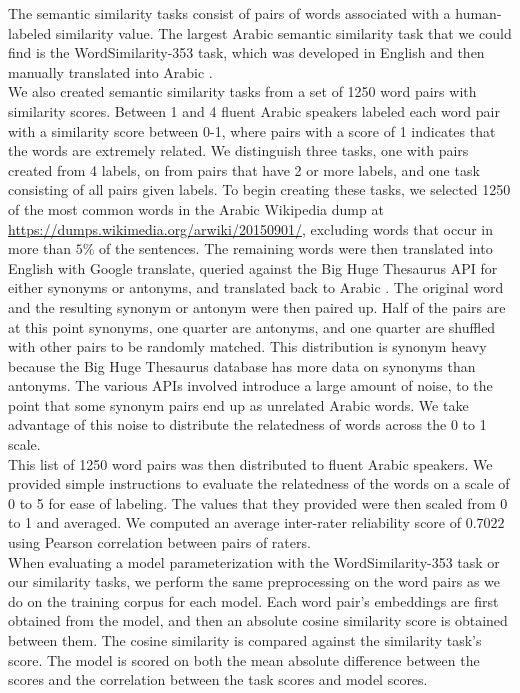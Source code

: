 The semantic similarity tasks consist of pairs of words associated with a human-labeled similarity value. The largest Arabic semantic similarity task that we could find is the WordSimilarity-353 task, which was developed in English and then manually translated into Arabic \cite{finkelstein:2001,hassan:2009}. 
\\
We also created semantic similarity tasks from a set of 1250 word pairs with similarity scores. Between 1 and 4 fluent Arabic speakers labeled each word pair with a similarity score between 0-1, where pairs with a score of 1 indicates that the words are extremely related. We distinguish three tasks, one with pairs created from 4 labels, on from pairs that have 2 or more labels, and one task consisting of all pairs given labels. To begin creating these tasks, we selected 1250 of the most common words in the Arabic Wikipedia dump \cite{wiki:xxx} at \url{https://dumps.wikimedia.org/arwiki/20150901/}, excluding words that occur in more than $5\%$ of the sentences. The remaining words were then translated into English with Google translate, queried against the Big Huge Thesaurus API for either synonyms or antonyms, and translated back to Arabic \cite{google:online,bhl:online}. The original word and the resulting synonym or antonym were then paired up. Half of the pairs are at this point synonyms, one quarter are antonyms, and one quarter are shuffled with other pairs to be randomly matched. This distribution is synonym heavy because the Big Huge Thesaurus database has more data on synonyms than antonyms. The various APIs involved introduce a large amount of noise, to the point that some synonym pairs end up as unrelated Arabic words. We take advantage of this noise to distribute the relatedness of words across the 0 to 1 scale.
\\
This list of 1250 word pairs was then distributed to fluent Arabic speakers. We provided simple instructions to evaluate the relatedness of the words on a scale of 0 to 5 for ease of labeling. The values that they provided were then scaled from 0 to 1 and averaged. We computed an average inter-rater reliability score of $0.7022$ using Pearson correlation between pairs of raters.
\\
When evaluating a model parameterization with the WordSimilarity-353 task or our similarity tasks, we perform the same preprocessing on the word pairs as we do on the training corpus for each model. Each word pair's embeddings are first obtained from the model, and then an absolute cosine similarity score is obtained between them. The cosine similarity is compared against the similarity task's score. The model is scored on both the mean absolute difference between the scores and the correlation between the task scores and model scores.


